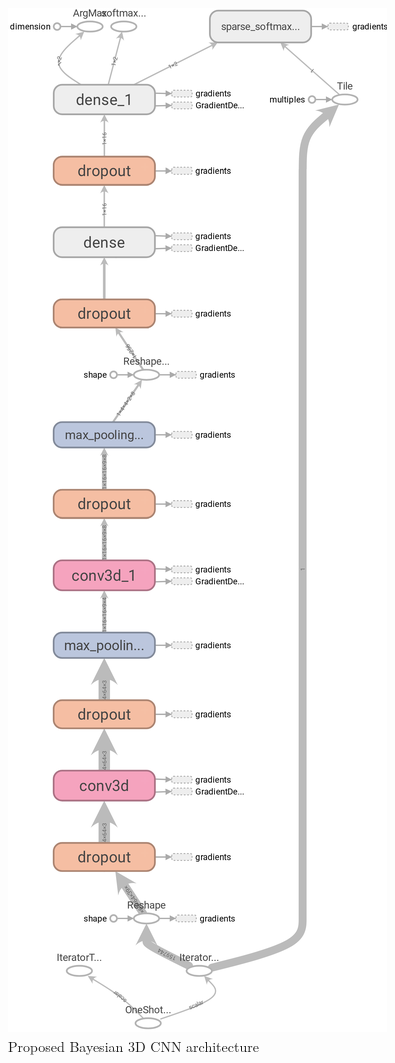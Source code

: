 \documentclass[a4paper,fleqn]{cas-dc}
\begin{document}
\begin{figure}
	\includegraphics[width=\linewidth]{images/cnnArch}
	\caption{Proposed Bayesian 3D CNN architecture}
	\label{fig:cnnArch}
\end{figure}
\end{document}

